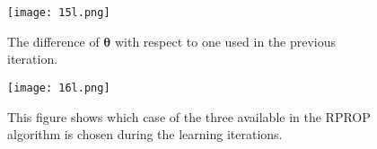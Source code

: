 \begin{figure}[h!]
	\centering
	\texttt{[image: 15l.png]}
	\caption{The difference of $\bm{\theta}$ with respect to one used in the previous iteration. }
	\label{fig:app_update}
\end{figure}


\begin{figure}[h!]
	\centering
	\texttt{[image: 16l.png]}
	\caption{This figure shows which case of the three available in the RPROP algorithm is chosen during the learning iterations.}
	\label{fig:app_multigrad}
\end{figure}












